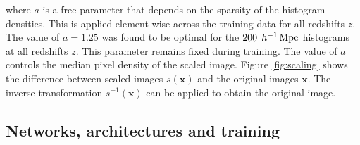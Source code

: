 \documentclass[twocolumn]{article}
\numberwithin{equation}{section}
\begin{document}
where $a$ is a free parameter that depends on the sparsity of the histogram densities. This is applied element-wise across 
the training data for all redshifts $z$. The value of $a=1.25$ was found to be optimal for the 
$200 \:  \: h^{-1} \,\textup{Mpc}$ histograms at all redshifts $z$. This parameter remains fixed during training. The value 
of $a$ controls the median pixel density of the scaled image. Figure \ref{fig:scaling} shows the difference between scaled 
images $s(\mathbf{x})$ and the original images $\mathbf{x}$. The inverse transformation $s^{-1}(\mathbf{x})$ can be applied 
to obtain the original image. 


\subsection{Networks, architectures and training}\label{training}

\end{document}
